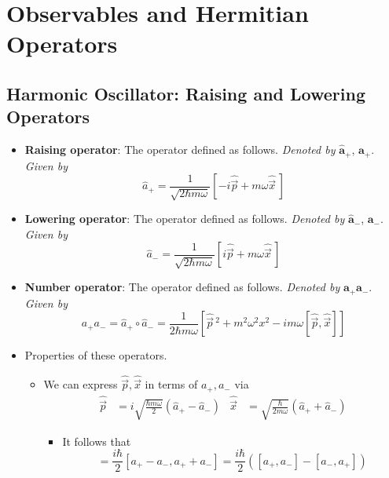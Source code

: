 \documentclass[../notes.tex]{subfiles}
\begin{document}
\chapter{Observables and Hermitian Operators}
\section{Harmonic Oscillator: Raising and Lowering Operators}
\begin{itemize}
    \item {}\textbf{Raising operator}: The operator defined as follows. \emph{Denoted by} $\bm{\hat{a}_+}$, $\bm{a_+}$. \emph{Given by}
    \begin{equation*}
        \hat{a}_+ = \frac{1}{\sqrt{2\hbar m\omega}}[-i\hat{\vec{p}}+m\omega\hat{\vec{x}}\,]
    \end{equation*}
    \item \textbf{Lowering operator}: The operator defined as follows. \emph{Denoted by} $\bm{\hat{a}_-}$, $\bm{a_-}$. \emph{Given by}
    \begin{equation*}
        \hat{a}_- = \frac{1}{\sqrt{2\hbar m\omega}}[i\hat{\vec{p}}+m\omega\hat{\vec{x}}\,]
    \end{equation*}
    \item \textbf{Number operator}: The operator defined as follows. \emph{Denoted by} $\bm{a_+a_-}$. \emph{Given by}
    \begin{equation*}
        a_+a_- = \hat{a}_+\circ\hat{a}_-
        = \frac{1}{2\hbar m\omega}\left[ \hat{\vec{p}}{\,}^2+m^2\omega^2x^2-im\omega[\hat{\vec{p}},\hat{\vec{x}}] \right]
    \end{equation*}
    \item Properties of these operators.
    \begin{itemize}
        \item We can express $\hat{\vec{p}},\hat{\vec{x}}$ in terms of $a_+,a_-$ via
        \begin{align*}
            \hat{\vec{p}} &= i\sqrt{\frac{\hbar m\omega}{2}}(\hat{a}_+-\hat{a}_-)&
            \hat{\vec{x}} &= \sqrt{\frac{\hbar}{2m\omega}}(\hat{a}_++\hat{a}_-)
        \end{align*}
        \begin{itemize}
            \item It follows that
            \begin{equation*}
                [\hat{\vec{p}},\hat{\vec{x}}] = \frac{i\hbar}{2}[a_+-a_-,a_++a_-]
                = \frac{i\hbar}{2}([a_+,a_-]-[a_-,a_+])

\end{equation*}
\end{itemize}
\end{itemize}
\end{itemize}
\end{document}
